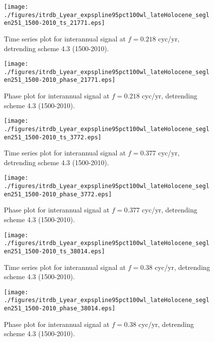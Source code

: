 \documentclass[phd,tocprelim]{cornell}
\begin{document}
\begin{figure}[!tbp]
\centering
\begin{minipage}[b]{0.45\textwidth}
\texttt{[image: ./figures/itrdb\_Lyear\_expspline95pct100wl\_lateHolocene\_seglen251\_1500-2010\_ts\_21771.eps]}
\caption{Time series plot for interannual signal at $f=0.218$ cyc/yr, detrending scheme 4.3 (1500-2010).}
\label{ts4.3p4}
\end{minipage}
\hfill
\begin{minipage}[b]{0.45\textwidth}
\texttt{[image: ./figures/itrdb\_Lyear\_expspline95pct100wl\_lateHolocene\_seglen251\_1500-2010\_phase\_21771.eps]}
\caption{Phase plot for interannual signal at $f=0.218$ cyc/yr, detrending scheme 4.3 (1500-2010).}
\label{map4.3p4}
\end{minipage}
\end{figure}

\begin{figure}[!tbp]
\centering
\begin{minipage}[b]{0.45\textwidth}
\texttt{[image: ./figures/itrdb\_Lyear\_expspline95pct100wl\_lateHolocene\_seglen251\_1500-2010\_ts\_3772.eps]}
\caption{Time series plot for interannual signal at $f=0.377$ cyc/yr, detrending scheme 4.3 (1500-2010).}
\label{ts4.3p5}
\end{minipage}
\hfill
\begin{minipage}[b]{0.45\textwidth}
\texttt{[image: ./figures/itrdb\_Lyear\_expspline95pct100wl\_lateHolocene\_seglen251\_1500-2010\_phase\_3772.eps]}
\caption{Phase plot for interannual signal at $f=0.377$ cyc/yr, detrending scheme 4.3 (1500-2010).}
\label{map4.3p5}
\end{minipage}
\end{figure}

\begin{figure}[!tbp]
\centering
\begin{minipage}[b]{0.45\textwidth}
\texttt{[image: ./figures/itrdb\_Lyear\_expspline95pct100wl\_lateHolocene\_seglen251\_1500-2010\_ts\_38014.eps]}
\caption{Time series plot for interannual signal at $f=0.38$ cyc/yr, detrending scheme 4.3 (1500-2010).}
\label{ts4.3p6}
\end{minipage}
\hfill
\begin{minipage}[b]{0.45\textwidth}
\texttt{[image: ./figures/itrdb\_Lyear\_expspline95pct100wl\_lateHolocene\_seglen251\_1500-2010\_phase\_38014.eps]}
\caption{Phase plot for interannual signal at $f=0.38$ cyc/yr, detrending scheme 4.3 (1500-2010).}
\label{map4.3p6}
\end{minipage}
\end{figure}
\end{document}
